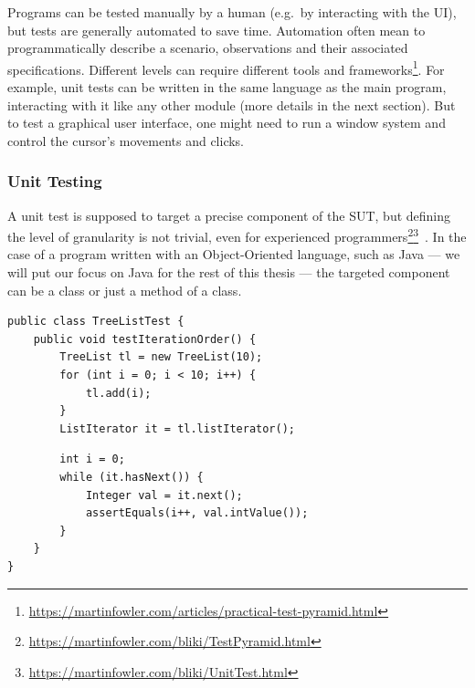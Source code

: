 \documentclass[a4paper,11pt]{sdm_internship}
\theoremstyle{definition}
\begin{document}
Programs can be tested manually by a human (e.g.\ by interacting with the UI), but tests are generally automated to save time.
Automation often mean to programmatically describe a scenario, observations and their associated specifications.
Different levels can require different tools and frameworks\footnote{\url{https://martinfowler.com/articles/practical-test-pyramid.html}}.
For example, unit tests can be written in the same language as the main program, interacting with it like any other module (more details in the next section).
But to test a graphical user interface, one might need to run a window system and control the cursor's movements and clicks.

\subsubsection{Unit Testing}%
\label{sssec:unit_testing}

A unit test is supposed to target a precise component of the SUT, but defining the level of granularity is not trivial, even for experienced programmers\footnote{\url{https://martinfowler.com/bliki/TestPyramid.html}}\footnote{\url{https://martinfowler.com/bliki/UnitTest.html}}~\cite{runeson2006survey}.
In the case of a program written with an Object-Oriented language, such as Java --- we will put our focus on Java for the rest of this thesis --- the targeted component can be a class or just a method of a class.

\begin{listing}
  \centering
  \begin{verbatim}
public class TreeListTest {
    public void testIterationOrder() {
        TreeList tl = new TreeList(10);
        for (int i = 0; i < 10; i++) {
            tl.add(i);
        }
        ListIterator it = tl.listIterator();
  \end{verbatim}
  \begin{verbatim}
        int i = 0;
        while (it.hasNext()) {
            Integer val = it.next();
            assertEquals(i++, val.intValue());
        }
    }
}
  \end{verbatim}
  \caption{Example of an object-oriented unit test (taken, and adapted for readability, from the Apache Commons Collections, in the class TreeListTest, line 270\protect\footnotemark): it consists of test inputs (lines 3--7) that manipulate the SUT\@; and assertions (line 11). Methods \texttt{.hasNext()} and \texttt{.next()} (lines 9 \& 10) are expected, implicitly, to behave correctly.}%
\label{lst:test_example}
\end{listing}
\end{document}
